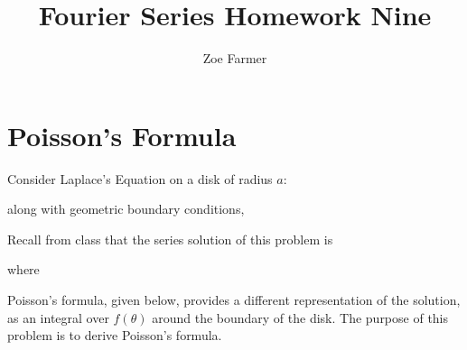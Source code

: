 \documentclass[10pt]{article}
\title{Fourier Series Homework Nine}
\author{Zoe Farmer}
\begin{document}
\maketitle

\section{Poisson's Formula}

Consider Laplace's Equation on a disk of radius $a$:

\label{eq:disklaplace}

along with geometric boundary conditions,

\label{eq:boundary}

Recall from class that the series solution of this problem is

\label{eq:seriessolution}

where


Poisson's formula, given below, provides a different representation of the solution, as an integral over $f(\theta)$
around the boundary of the disk. The purpose of this problem is to derive Poisson's formula.
\end{document}
